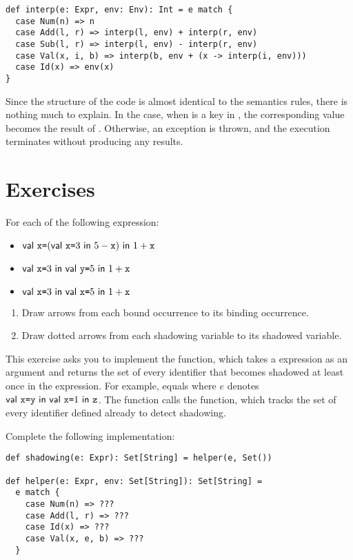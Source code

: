 \begin{verbatim}
def interp(e: Expr, env: Env): Int = e match {
  case Num(n) => n
  case Add(l, r) => interp(l, env) + interp(r, env)
  case Sub(l, r) => interp(l, env) - interp(r, env)
  case Val(x, i, b) => interp(b, env + (x -> interp(i, env)))
  case Id(x) => env(x)
}
\end{verbatim}

Since the structure of the code is almost identical to the semantics rules, there
is nothing much to explain. In the  case, when  is a key in
, the corresponding value becomes the result of .
Otherwise, an exception is thrown, and the execution
terminates without producing any results.

\section{Exercises}

\begin{exercise}

For each of the following expression:
\begin{itemize}
  \item $\textsf{val}\ \texttt{x}\texttt{=}(\textsf{val}\ \texttt{x}\texttt{=}3\ \textsf{in}\ 5-\texttt{x})\ \textsf{in}\ 1+\texttt{x}$
  \item $\textsf{val}\ \texttt{x}\texttt{=}3\ \textsf{in}\ \textsf{val}\ \texttt{y}\texttt{=}5\ \textsf{in}\ 1+\texttt{x}$
  \item $\textsf{val}\ \texttt{x}\texttt{=}3\ \textsf{in}\ \textsf{val}\ \texttt{x}\texttt{=}5\ \textsf{in}\ 1+\texttt{x}$
\end{itemize}
\begin{enumerate}
  \item Draw arrows from each bound occurrence to its binding occurrence.
  \item Draw dotted arrows from each shadowing variable to its shadowed variable.
\end{enumerate}

\end{exercise}

\begin{exercise}

This exercise asks you to implement the  function, which
takes a \lang expression as an argument and returns the set of every
identifier that becomes shadowed at least once in the expression. For
example,  equals  where $e$ denotes
$\textsf{val}\ \texttt{x}\texttt{=}\texttt{y}\ \textsf{in}\ \textsf{val}\ \texttt{x}\texttt{=}1\ \textsf{in}\ \texttt{z}$.  The  function
calls the  function, which tracks the set of every identifier
defined already to detect shadowing.

Complete the following implementation:

\begin{verbatim}
def shadowing(e: Expr): Set[String] = helper(e, Set())

def helper(e: Expr, env: Set[String]): Set[String] =
  e match {
    case Num(n) => ???
    case Add(l, r) => ???
    case Id(x) => ???
    case Val(x, e, b) => ???
  }
\end{verbatim}

\end{exercise}
